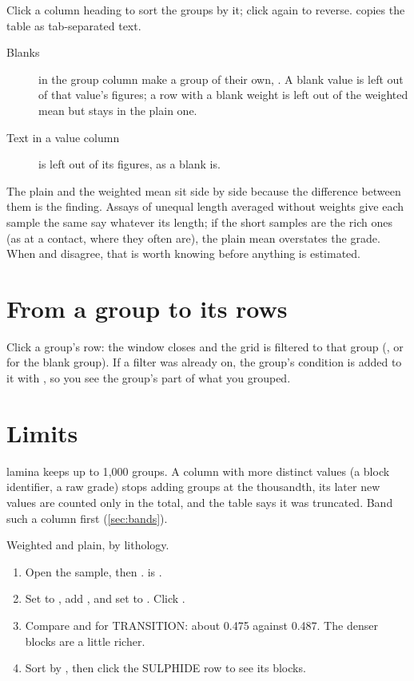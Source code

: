 Click a column heading to sort the groups by it; click again to reverse.  copies the table
as tab-separated text.

\begin{description}
\item[Blanks] in the group column make a group of their own, . A blank value is left out of
that value's figures; a row with a blank weight is left out of the weighted mean but stays in the plain
one.
\item[Text in a value column] is left out of its figures, as a blank is.
\end{description}

\begin{why}
The plain and the weighted mean sit side by side because the difference between them is the finding.
Assays of unequal length averaged without weights give each sample the same say whatever its length; if
the short samples are the rich ones (as at a contact, where they often are), the plain mean overstates the
grade. When  and  disagree, that is worth knowing before anything is estimated.
\end{why}

\section{From a group to its rows}

Click a group's row: the window closes and the grid is filtered to that group (, or
 for the blank group). If a filter was already on, the group's condition is added to
it with , so you see the group's part of what you grouped.

\section{Limits}

lamina keeps up to 1{,}000 groups. A column with more distinct values (a block identifier, a raw grade)
stops adding groups at the thousandth, its later new values are counted only in the total, and the table
says it was truncated. Band such a column first (\cref{sec:bands}).

\begin{tryit}
Weighted and plain, by lithology.
\begin{enumerate}
\item Open the sample, then .  is .
\item Set  to , add , and set  to . Click
.
\item Compare  and  for TRANSITION: about 0.475 against 0.487. The
denser blocks are a little richer.
\item Sort by , then click the SULPHIDE row to see its blocks.
\end{enumerate}
\end{tryit}
